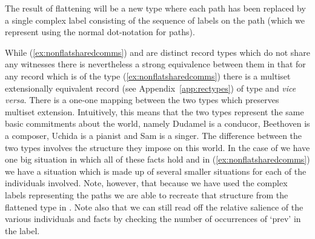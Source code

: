The result of flattening \preveg{} will be a new type \nexteg{} where each path
has been replaced by a single complex label consisting of the sequence
of labels on the path (which we represent using the normal
dot-notation for paths).
\begin{ex} 
\label{ex:flatsharedcomms}
\end{ex} 
While (\ref{ex:nonflatsharedcomms}) and \preveg{} are distinct record types which do
not share any witnesses there is nevertheless a strong equivalence
between them in that for any record which is of the type
(\ref{ex:nonflatsharedcomms}) there is a multiset extensionally
equivalent record (see Appendix~\ref{app:rectypes}) of type \preveg{} and \textit{vice
  versa}.  There is a one-one mapping between the two types which
preserves multiset extension.  Intuitively, this means that the two
types represent the same basic commitments about the world, namely
Dudamel is a conducor, Beethoven is a composer, Uchida is a pianist
and Sam is a singer.  The difference between the two types involves
the structure they impose on this world.  In the case of \preveg{} we
have one big situation in which all of these facts hold and in
(\ref{ex:nonflatsharedcomms}) we have a situation which is made up of
several smaller situations for each of the individuals involved. Note,
however, that because we have used the complex labels representing the
paths we are able to recreate that structure from the flattened type
in \preveg{}.
Note also that we can still read off the relative salience of the
various individuals and facts by checking the number of occurrences
of `prev' in the label.  

